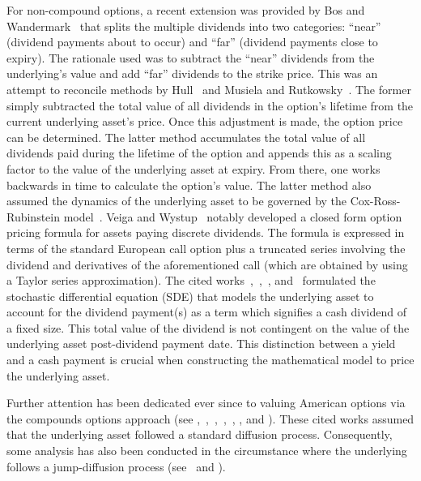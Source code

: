 For non-compound options, a recent extension was provided by Bos and  Wandermark~\cite{Bos2002} that splits the multiple dividends into two categories: ``near'' (dividend payments about to occur) and ``far'' (dividend payments close to expiry). The rationale used was to subtract the ``near'' dividends from the underlying's value and add ``far'' dividends to the strike price. This was an attempt to reconcile methods by Hull~\cite[pp. 298]{Hull1989} and Musiela and Rutkowsky~\cite[pp. 53--54]{Musiela1997}. The former simply subtracted the total value of all dividends in the option's lifetime from the current underlying asset's price. Once this adjustment is made, the option price can be determined. The latter method accumulates the total value of all dividends paid during the lifetime of the option and appends this as a scaling factor to the value of the underlying asset at expiry. From there, one works backwards in time to calculate the option's value. The latter method also assumed the dynamics of the underlying asset to be governed by the Cox-Ross-Rubinstein model~\cite{Cox1979}. Veiga and Wystup~\cite{Veiga2009} notably developed a closed form option pricing formula for assets paying discrete dividends. The formula is expressed in terms of the standard European call option plus a truncated series involving the dividend and derivatives of the aforementioned call (which are obtained by using a Taylor series approximation). The cited works~\cite{Roll1977},~\cite{Geske1979},~\cite{Bos2002}, and~\cite{Veiga2009} formulated the stochastic differential equation (SDE) that models the underlying asset to account for the dividend payment(s) as a term which signifies a cash dividend of a fixed size. This total value of the dividend is not contingent on the value of the underlying asset post-dividend payment date. This distinction between a yield and a cash payment is crucial when constructing the mathematical model to price the underlying asset.

Further attention has been dedicated ever since to valuing American options via the compounds options approach (see \cite{Geske1984},~\cite{Omberg1987},~\cite{Bunch1992},~\cite{Breen1991},~\cite{Ho1997}, \cite{Chang2001}, and \cite{Zhylyevskyy2010}). These cited works assumed that the underlying asset followed a standard diffusion process. Consequently, some analysis has also been conducted in the circumstance where the underlying follows a jump-diffusion process (see~\cite{Gukhal2003} and \cite{Li2005}).


